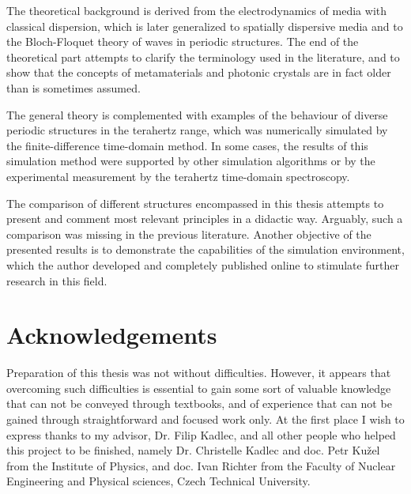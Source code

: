 The theoretical background is derived from the electrodynamics of media with classical dispersion, which is later generalized to spatially dispersive media and to the Bloch-Floquet theory of waves in periodic structures. The end of the theoretical part attempts to clarify the terminology used in the literature, and to show that the concepts of metamaterials and photonic crystals are in fact older than is sometimes assumed.

The general theory is complemented with examples of the behaviour of diverse periodic structures in the terahertz range, which was numerically simulated by the finite-difference time-domain method. In some cases, the results of this simulation method were supported by other simulation algorithms or by the experimental measurement by the terahertz time-domain spectroscopy. 

The comparison of different structures encompassed in this thesis attempts to present and comment most relevant principles in a didactic way. Arguably, such a comparison was missing in the previous literature.
Another objective of the presented results is to demonstrate the capabilities of the simulation environment, which the author developed and completely published online to stimulate further research in this field. 


\thispagestyle{empty} \newpage
\chapter*{Acknowledgements}
Preparation of this thesis was not without difficulties. However, it appears that overcoming such difficulties is essential to gain some sort of valuable knowledge that can not be conveyed through textbooks, and of experience that can not be gained through straightforward and focused work only.  At the first place I wish to express thanks to my advisor, Dr. Filip Kadlec, and all other people who helped this project to be finished, namely Dr. Christelle Kadlec and doc. Petr Ku\v{z}el  from the Institute of Physics, and doc. Ivan Richter from the Faculty of Nuclear Engineering and Physical sciences, Czech Technical University. 

